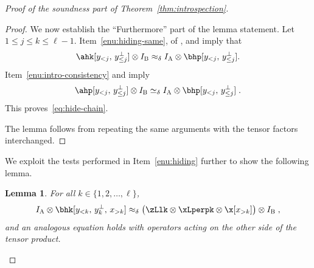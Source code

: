 \documentclass[11pt]{article}
\newtheorem{lemma}[theorem]{Lemma}
\theoremstyle{definition}
\newcommand{\Id}{\ensuremath{I}}
\newcommand{\ia}{\Id_\alice}
\newcommand{\ib}{\Id_\bob}
\newcommand{\labelstyle}[1]{\ensuremath{\textsc{#1}}\xspace}
\newcommand{\alice}{\labelstyle{A}}
\newcommand{\bob}{\labelstyle{B}}
\begin{document}
\begin{proof}[Proof of the soundness part of Theorem~\ref{thm:introspection}]
\begin{proof}
    We now establish the ``Furthermore'' part of the lemma statement.
    Let $1 \leq j \leq k \leq \ell-1$.
    Item~\ref{enu:hiding-same},  of
    , and  imply that
    \begin{equation}
      \ahk[y_{<j},\, y_{\leq j}^\perp] \otimes \ib \approx_\delta
      \ia \otimes \bhp[y_{<j},\, y_{\leq j}^\perp].
    \end{equation}
    Item~\ref{enu:intro-consistency} and  imply
    \begin{equation}
      \ahp[y_{<j},\, y_{\leq j}^\perp] \otimes \ib \simeq_\delta
      \ia \otimes \bhp[y_{<j},\, y_{\leq j}^\perp]\;.
    \end{equation}
    This proves~\eqref{eq:hide-chain}.

    The lemma follows from repeating the same arguments with the tensor factors
    interchanged.
	\end{proof}
	
	We exploit the tests performed in Item~\ref{enu:hiding} further to show the
  following lemma.

  \begin{lemma}
    \label{lem:hide-rigidity}
    For all $k \in \{1, 2, \ldots, \ell\}$,
    \begin{equation*}
      \ia \otimes \bhk[y_{<k},\, y^\perp_k,\, x_{>k}] \approx_\delta
      \bigl( \zLlk \otimes \xLperpk \otimes \x[x_{>k}] \bigr) \otimes \ib\;,
    \end{equation*}
    and an analogous equation holds with operators acting on the other side of
    the tensor product.
  \end{lemma}


\end{proof}
\end{document}
